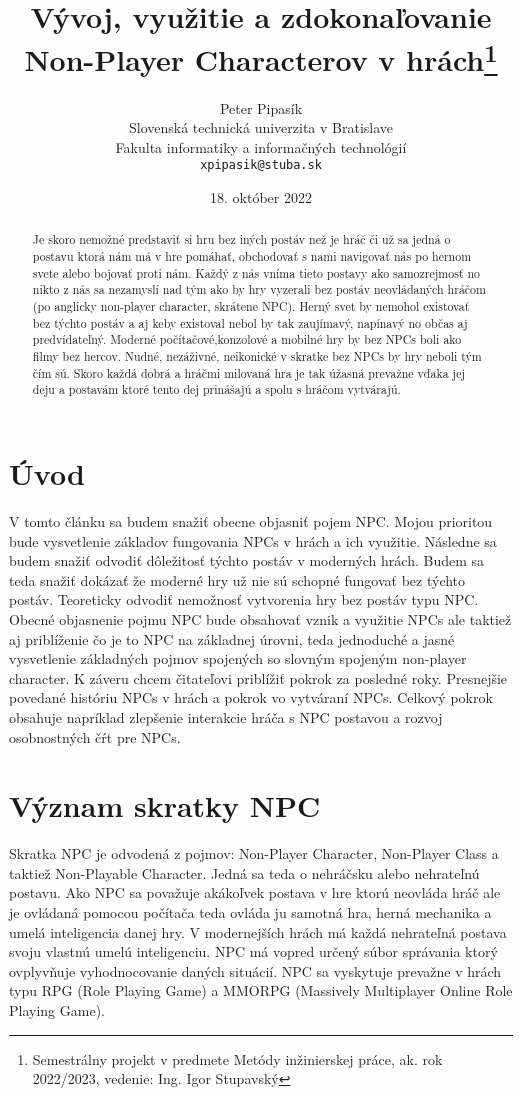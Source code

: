\documentclass[10pt,twoside,slovak,a4paper]{article}
\title{Vývoj, využitie a zdokonaľovanie Non-Player Characterov v hrách\thanks{Semestrálny projekt v predmete Metódy inžinierskej práce, ak. rok 2022/2023, vedenie: Ing. Igor Stupavský}}
\author{Peter Pipasík\\[2pt]
	{\small Slovenská technická univerzita v Bratislave}\\
	{\small Fakulta informatiky a informačných technológií}\\
	{\small \texttt{xpipasik@stuba.sk}}
	}
\date{\small 18. október 2022}
\begin{document}
\maketitle


\begin{abstract}
Je skoro nemožné predstaviť si hru bez iných postáv než je hráč či už sa jedná o postavu ktorá nám má v hre pomáhať, obchodovať s nami navigovať nás po hernom svete alebo bojovať proti nám. Každý z nás vníma tieto postavy ako samozrejmosť no nikto z nás sa nezamyslí nad tým ako by hry vyzerali bez postáv neovládaných hráčom (po anglicky non-player character, skrátene NPC). 
Herný svet by nemohol existovať bez týchto postáv a aj keby existoval nebol by tak zaujímavý, napínavý no občas aj predvídateľný. Moderné počítačové,konzolové a mobilné hry by bez NPCs boli ako filmy bez hercov. Nudné, nezáživné, neikonické v skratke bez NPCs by hry neboli tým čím sú. Skoro každá dobrá a hráčmi milovaná hra je tak úžasná prevažne vďaka jej deju a postavám ktoré tento dej prinášajú a spolu s hráčom vytvárajú.   

\end{abstract}

\section{Úvod}
V tomto článku sa budem snažiť obecne objasniť pojem NPC. Mojou prioritou bude vysvetlenie základov fungovania NPCs v hrách a ich využitie. Následne sa budem snažiť odvodiť dôležitosť týchto postáv v moderných hrách. Budem sa teda snažiť dokázať že moderné hry už nie sú schopné fungovať bez týchto postáv. Teoreticky odvodiť nemožnosť vytvorenia hry bez postáv typu NPC.
Obecné objasnenie pojmu NPC bude obsahovať vznik a využitie NPCs ale taktiež aj priblíženie čo je to NPC na základnej úrovni, teda jednoduché a jasné vysvetlenie základných pojmov spojených so slovným spojeným non-player character.
K záveru chcem čitateľovi priblížiť pokrok za posledné roky. Presnejšie povedané históriu NPCs v hrách a pokrok vo vytváraní NPCs. Celkový pokrok obsahuje napríklad zlepšenie interakcie hráča s NPC postavou a rozvoj osobnostných čŕt pre NPCs. 


\section{Význam skratky NPC}  \label{Vyznam skratky}
Skratka NPC je odvodená z pojmov: Non-Player Character, Non-Player Class a taktiež Non-Playable Character. Jedná sa teda o nehráčsku alebo nehrateľnú postavu. Ako NPC sa považuje akákoľvek postava v hre ktorú neovláda hráč ale je ovládaná pomocou počítača teda ovláda ju samotná hra, herná mechanika a umelá inteligencia danej hry. V modernejších hrách má každá nehrateľná postava svoju vlastnú umelú inteligenciu. NPC má vopred určený súbor správania ktorý ovplyvňuje vyhodnocovanie daných situácií. NPC sa vyskytuje prevažne v hrách typu RPG (Role Playing Game) a MMORPG (Massively Multiplayer Online Role Playing Game).
\end{document}
